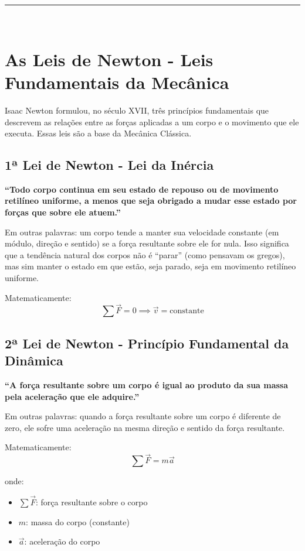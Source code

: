 \documentclass[a4paper,12pt]{article}
\begin{document}
\noindent\rule{\linewidth}{0.6pt}\\

\section*{As Leis de Newton - Leis Fundamentais da Mecânica}

Isaac Newton formulou, no século XVII, três princípios fundamentais que descrevem as relações entre as forças aplicadas a um corpo e o movimento que ele executa. Essas leis são a base da Mecânica Clássica.

\subsection*{1ª Lei de Newton - Lei da Inércia}

\textbf{``Todo corpo continua em seu estado de repouso ou de movimento retilíneo uniforme, a menos que seja obrigado a mudar esse estado por forças que sobre ele atuem.''}

Em outras palavras: um corpo tende a manter sua velocidade constante (em módulo, direção e sentido) se a força resultante sobre ele for nula. Isso significa que a tendência natural dos corpos não é ``parar'' (como pensavam os gregos), mas sim manter o estado em que estão, seja parado, seja em movimento retilíneo uniforme.

Matematicamente:
\[
\sum \vec{F} = 0 \implies \vec{v} = \text{constante}
\]

\subsection*{2ª Lei de Newton - Princípio Fundamental da Dinâmica}

\textbf{``A força resultante sobre um corpo é igual ao produto da sua massa pela aceleração que ele adquire.''}

Em outras palavras: quando a força resultante sobre um corpo é diferente de zero, ele sofre uma aceleração na mesma direção e sentido da força resultante.

Matematicamente:
\[
\sum \vec{F} = m \vec{a}
\]

onde:
\begin{itemize}
    \item \( \sum \vec{F} \): força resultante sobre o corpo
    \item \( m \): massa do corpo (constante)
    \item \( \vec{a} \): aceleração do corpo
\end{itemize}
\end{document}
